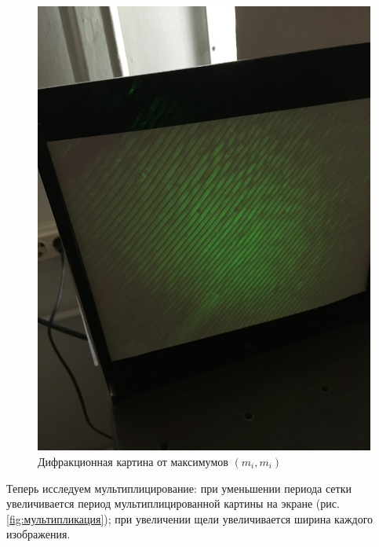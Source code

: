 \documentclass[a4paper]{article}
\begin{document}
\begin{figure}[tbp]
	\centering
	\includegraphics[height=0.4\textheight]{IMG_3264}
	\caption{Дифракционная картина от максимумов $(m_i, m_i)$}
	\label{fig:img3264}
\end{figure}

Теперь исследуем мультиплицирование: при уменьшении периода сетки увеличивается период мультиплицированной картины на экране (рис. \ref{fig:мультипликация}); при увеличении щели увеличивается ширина каждого изображения. 
\end{document}
